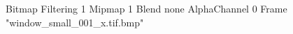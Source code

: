 {Bitmap
	{Filtering 1}
	{Mipmap 1}
	{Blend none}
	{AlphaChannel 0}
	{Frame "window_small_001_x.tif.bmp"}
}

